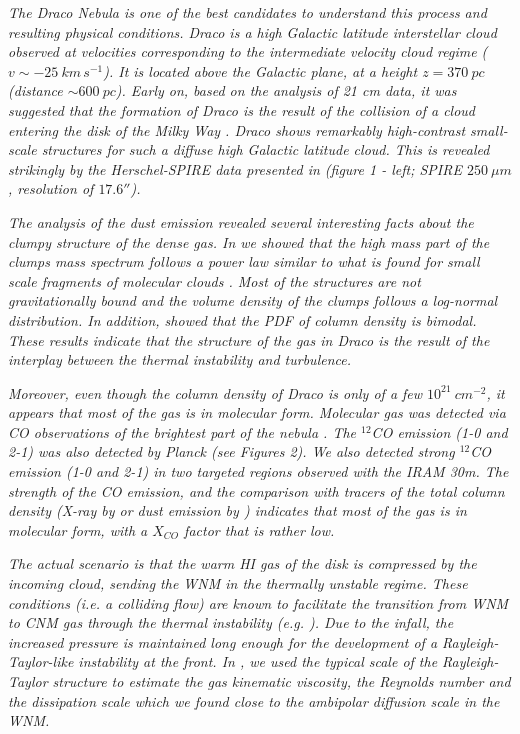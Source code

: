 \documentclass[traditabstract]{aa}
\begin{document}
\textit{   The Draco Nebula is one of the best candidates to understand this process and resulting physical conditions. Draco is a high Galactic latitude interstellar cloud observed at velocities corresponding to the intermediate velocity cloud regime ($v\sim -25\: km\, s^{-1}$). It is located above the Galactic plane, at a height $z=370\: pc$ (distance $\sim 600\: pc$). Early on, based on the analysis of 21 cm data, it was suggested that the formation of Draco is the result of the collision of a cloud entering the disk of the Milky Way \citep{Goerigk_1983}.
Draco shows remarkably high-contrast small-scale structures for such a diffuse high Galactic latitude cloud. This is revealed strikingly by the \emph{Herschel}-SPIRE data presented in \cite{MAMD_2017b} (figure 1 - left; SPIRE $250\: \mu m$, resolution of $17.6''$).}

\textit{   The analysis of the dust emission revealed several interesting facts about the clumpy structure of the dense gas. In \cite{MAMD_2017b} we showed that the high mass part of the clumps mass spectrum follows a power law similar to what is found for small scale fragments of molecular clouds \cite{Peretto_2010}. Most of the structures are not gravitationally bound and the volume density of the clumps follows a log-normal distribution. In addition, \cite{Schneider_2017} showed that the PDF of column density is bimodal. These results indicate that the structure of the gas in Draco is the result of the interplay between the thermal instability and turbulence.}

\textit{   Moreover, even though the column density of Draco is only of a few $10^{21}\: cm^{-2}$, it appears that most of the gas is in molecular form. Molecular gas was detected via CO observations of the brightest part of the nebula \citep{Mebold_1985,Rohlfs_1989}. The $^{12}$CO emission (1-0 and 2-1) was also detected by Planck (see Figures 2). We also detected strong $^{12}$CO emission (1-0 and 2-1) in two targeted regions observed with the IRAM 30m. The strength of the CO emission, and the comparison with tracers of the total column density (X-ray by \citealt{Moritz_1998} or dust emission by \citealt{Herbstmeier_1993, Planck_XXIV_2011}) indicates that most of the gas is in molecular form, with a $X_{CO}$ factor that is rather low.}

\textit{   The actual scenario is that the warm HI gas of the disk is compressed by the incoming cloud, sending the WNM in the thermally unstable regime. These conditions (i.e. a colliding flow) are known to facilitate the transition from WNM to CNM gas through the thermal instability (e.g. \citealt{Saury_2014}). Due to the infall, the increased pressure is maintained long enough for the development of a Rayleigh-Taylor-like instability at the front. In \cite{MAMD_2017b}, we used the typical scale of the Rayleigh-Taylor structure to estimate the gas kinematic viscosity, the Reynolds number and the dissipation scale which we found close to the ambipolar diffusion scale in the WNM.}
\end{document}
